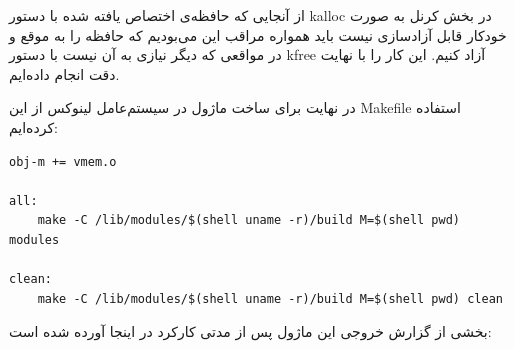 \documentclass{article}
\begin{document}
از آنجایی که حافظه‌ی اختصاص یافته شده با دستور kalloc در بخش کرنل به صورت خودکار قابل آزادسازی نیست باید همواره مراقب این می‌بودیم که حافظه را به موقع و در مواقعی که دیگر نیازی به آن نیست با دستور kfree آزاد کنیم. این کار را با نهایت دقت انجام داده‌ایم.

در نهایت برای ساخت ماژول در سیستم‌عامل لینوکس از این Makefile استفاده کرده‌ایم:

\begin{latin}
\begin{verbatim}
obj-m += vmem.o

all:
    make -C /lib/modules/$(shell uname -r)/build M=$(shell pwd) modules

clean:
    make -C /lib/modules/$(shell uname -r)/build M=$(shell pwd) clean
\end{verbatim}
\end{latin}

بخشی از گزارش خروجی این ماژول پس از مدتی کارکرد در اینجا آورده شده است:
\end{document}

